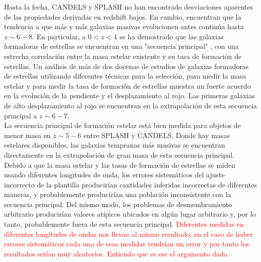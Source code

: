 \documentclass{article}
\begin{document}
Hasta la fecha, CANDELS y SPLASH no han encontrado desviaciones aparentes de las propiedades derivadas en redshift bajos. En cambio, encuentran que la tendencia a que más y más galaxias masivas evolucionen antes continúa hasta $z \sim 6 - 8$. En particular, a $0< z <4$ se ha demostrado que las galaxias formadoras de estrellas se encuentran en una "secuencia principal" \citep{Renzini_2015}, con una estrecha correlación entre la masa estelar existente y su tasa de formación de estrellas. Un análisis de más de dos docenas de estudios de galaxias formadoras de estrellas utilizando diferentes técnicas para la selección, para medir la masa estelar y para medir la tasa de formación de estrellas muestra un fuerte acuerdo en la evolución de la pendiente y el desplazamiento al rojo.
Las primeras galaxias de alto desplazamiento al rojo se encuentran en la extrapolación de esta secuencia principal a $z \sim 6-7$.\\

La secuencia principal de formación estelar está bien medida para objetos de menor masa en $z\sim 5-6$ entre SPLASH y CANDELS. Donde hay masas estelares disponibles, las galaxias tempranas más masivas se encuentran directamente en la extrapolación de gran masa de esta secuencia principal. Debido a que la masa estelar y las tasas de formación de estrellas se miden usando diferentes longitudes de onda, los errores sistemáticos del ajuste incorrecto de la plantilla producirían cantidades inferidas incorrectas de diferentes maneras, y probablemente producirían una población inconsistente con la secuencia principal. Del mismo modo, los problemas de desmembramiento arbitrario producirían valores atípicos ubicados en algún lugar arbitrario y, por lo tanto, probablemente fuera de esta secuencia principal. \textcolor{red}{Diferentes medidas en diferentes longitudes de ondas nos llevan al mismo resultado, en el caso de haber errores sistemáticos cada una de esas medidas tendrían un error y por tanto los resultados serían muy aleatorios. Entiendo que es ese el argumento dado.} \\
\end{document}
